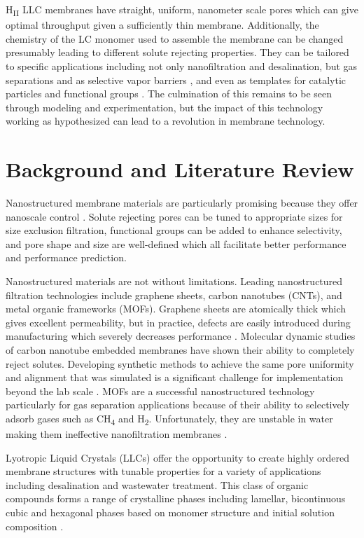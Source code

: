 \documentclass[12pt]{article}
\begin{document}
H\textsubscript{II} LLC membranes have straight, uniform, nanometer scale pores which can give optimal throughput given a sufficiently thin membrane. Additionally, the chemistry of the LC monomer used to assemble the membrane can be changed \cite{zhou_supported_2005} presumably leading to different solute rejecting properties. They can be tailored to specific applications including not only nanofiltration and desalination, but gas separations and as selective vapor barriers \cite{gin_polymerized_2008}, and even as templates for catalytic particles and functional groups \cite{ding_catalytic_2000}. The culmination of this remains to be seen through modeling and experimentation, but the impact of this technology working as hypothesized can lead to a revolution in membrane technology.

\section{Background and Literature Review}
Nanostructured membrane materials are particularly promising because they offer nanoscale control \cite{humplik_nanostructured_2011}. Solute rejecting pores can be tuned to appropriate sizes for size exclusion filtration, functional groups can be added to enhance selectivity, and pore shape and size are well-defined which all facilitate better performance and performance prediction.

Nanostructured materials are not without limitations. Leading nanostructured filtration technologies include graphene sheets, carbon nanotubes (CNTs), and metal organic frameworks (MOFs). Graphene sheets are atomically thick which gives excellent permeability, but in practice, defects are easily introduced during manufacturing which severely decreases performance \cite{cohen-tanugi_multilayer_2016}. Molecular dynamic studies of carbon nanotube embedded membranes have shown their ability to completely reject solutes. Developing synthetic methods to achieve the same pore uniformity and alignment that was simulated is a significant challenge for implementation beyond the lab scale \cite{mauter_environmental_2008}. MOFs are a successful nanostructured technology particularly for gas separation applications because of their ability to selectively adsorb gases such as CH\textsubscript{4} and H\textsubscript{2}. Unfortunately, they are unstable in water making them ineffective nanofiltration membranes \cite{dias_towards-2015}. 

Lyotropic Liquid Crystals (LLCs) offer the opportunity to create highly ordered membrane structures with tunable properties for a variety of applications including desalination and wastewater treatment. This class of organic compounds forms a range of crystalline phases including lamellar, bicontinuous cubic and hexagonal phases based on monomer structure and initial solution composition \cite{lee_polymerization_1995, smith_ordered_1997}.
\end{document}
